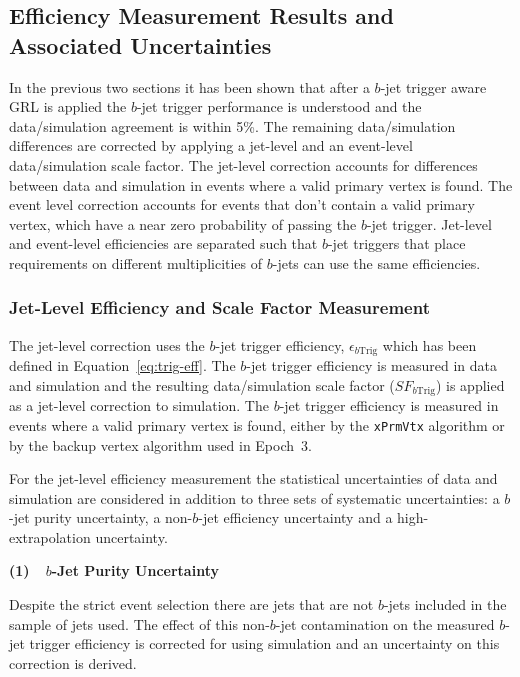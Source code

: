 \clearpage
\subsection{Efficiency Measurement Results and Associated Uncertainties}
\label{sec:trig-eff_syst}

In the previous two sections it has been shown that after a $b$-jet trigger aware GRL is applied
the $b$-jet trigger performance is understood and the data/simulation agreement is within 5\%.
The remaining data/simulation differences are corrected by applying a jet-level and an event-level data/simulation scale factor.
The jet-level correction accounts for differences between data and simulation in events where a valid primary vertex is found.
The event level correction accounts for events that don't contain a valid primary vertex, which have a near zero probability of passing the $b$-jet trigger.
Jet-level and event-level efficiencies are separated such that $b$-jet triggers that place requirements on different multiplicities of $b$-jets can use the same efficiencies.

\subsubsection{Jet-Level Efficiency and Scale Factor Measurement}
\label{sec:trig-jetLevelEff}

The jet-level correction uses the $b$-jet trigger efficiency, $\epsilon_{b\text{Trig}}$
which has been defined in Equation~\ref{eq:trig-eff}.
The $b$-jet trigger efficiency is measured in data and simulation
and the resulting data/simulation scale factor ($SF_{b\text{Trig}}$) is applied as a jet-level correction to simulation.
The $b$-jet trigger efficiency is measured in events where a valid primary vertex is found,
either by the \verb|xPrmVtx| algorithm or by the backup vertex algorithm used in Epoch~3.

For the jet-level efficiency measurement the 
statistical uncertainties of data and simulation are considered in addition
to three sets of systematic uncertainties:
a $b$-jet purity uncertainty,
a non-$b$-jet efficiency uncertainty
and a high-\pT{} extrapolation uncertainty.

\noindent
\textbf{(1)~~$b$-Jet Purity Uncertainty} 

Despite the strict event selection there are
jets that are not $b$-jets included in the sample of jets used.
The effect of this non-$b$-jet contamination on the measured $b$-jet trigger efficiency
is corrected for using simulation and an uncertainty on this correction is derived.

